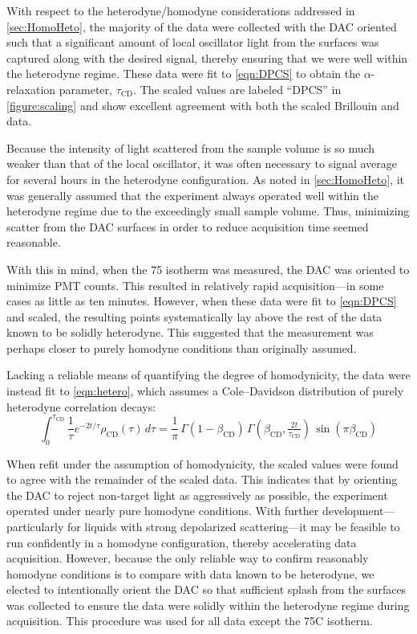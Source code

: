 With respect to the heterodyne/homodyne considerations addressed in \sect \ref{sec:HomoHeto}, the majority of the data were collected with the DAC oriented such that a significant amount of local oscillator light from the surfaces was captured along with the desired signal, thereby ensuring that we were well within the heterodyne regime. These data were fit to \eqn \ref{eqn:DPCS} to obtain the $\alpha$-relaxation parameter, $\tau_{\mathrm{CD}}$. The scaled values are labeled “DPCS” in \fig  \ref{figure:scaling} and show excellent agreement with both the scaled Brillouin and \tgp data.  

Because the intensity of light scattered from the sample volume is so much weaker than that of the local oscillator, it was often necessary to signal average for several hours in the heterodyne configuration. As noted in \sect \ref{sec:HomoHeto}, it was generally assumed that the experiment always operated well within the heterodyne regime due to the exceedingly small sample volume. Thus, minimizing scatter from the DAC surfaces in order to reduce acquisition time seemed reasonable.  

With this in mind, when the 75\textdegree{} isotherm was measured, the DAC was oriented to minimize PMT counts. This resulted in relatively rapid acquisition—in some cases as little as ten minutes. However, when these data were fit to \eqn \ref{eqn:DPCS} and scaled, the resulting points systematically lay above the rest of the data known to be solidly heterodyne. This suggested that the measurement was perhaps closer to purely homodyne conditions than originally assumed.  

Lacking a reliable means of quantifying the degree of homodynicity, the data were instead fit to \eqn \ref{eqn:hetero}, which assumes a Cole–Davidson distribution of purely heterodyne correlation decays:  
\begin{equation}\label{eqn:hetero}
	\int_{0}^{\tau_{\mathrm{CD}}} \frac{1}{\tau} e^{-2t/\tau} \rho_{\mathrm{CD}}(\tau)\, d\tau
	= \frac{1}{\pi} \, \Gamma\!\left(1-\beta_{\mathrm{CD}}\right)\,
	\Gamma\!\left(\beta_{\mathrm{CD}}, \tfrac{2t}{\tau_{\mathrm{CD}}}\right)\,
	\sin\!\left(\pi \beta_{\mathrm{CD}}\right)
\end{equation}

When refit under the assumption of homodynicity, the scaled values were found to agree with the remainder of the scaled data. This indicates that by orienting the DAC to reject non‑target light as aggressively as possible, the experiment operated under nearly pure homodyne conditions. With further development—particularly for liquids with strong depolarized scattering—it may be feasible to run confidently in a homodyne configuration, thereby accelerating data acquisition. However, because the only reliable way to confirm reasonably homodyne conditions is to compare with data known to be heterodyne, we elected to intentionally orient the DAC so that sufficient splash from the surfaces was collected to ensure the data were solidly within the heterodyne regime during acquisition. This procedure was used for all data except the 75\textdegree{}C isotherm.

